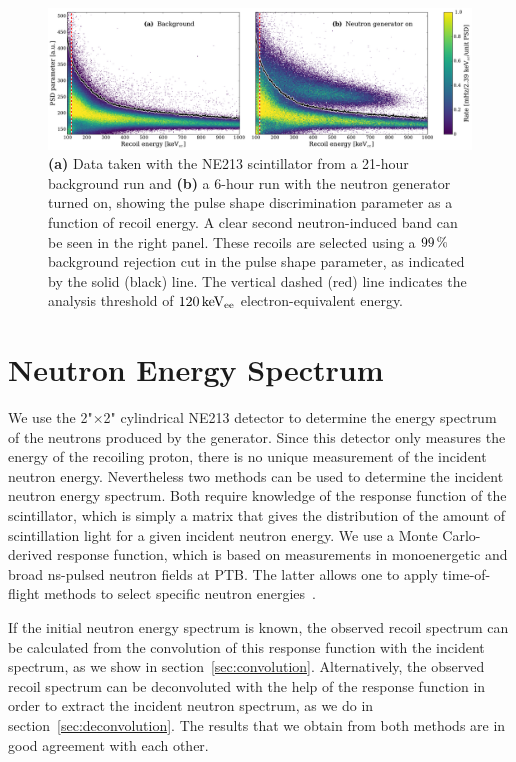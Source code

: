 \begin{figure}[!htbp]
\centering
    \includegraphics[width=1.0\textwidth]{figures/ng/hist2d_bg_and_fg}
    \caption{{\bf (a)} Data taken with the NE213 scintillator from a 21-hour background run and {\bf (b)} a 6-hour run with the neutron generator turned on, showing the pulse shape discrimination parameter as a function of recoil energy. A clear second neutron-induced band can be seen in the right panel. These recoils are selected using a $99\,\mathrm{\%}$ background rejection cut in the pulse shape parameter, as indicated by the solid (black) line. The vertical dashed (red) line indicates the analysis threshold of $120\,\mathrm{keV_{ee}}$ electron-equivalent energy.}\label{fig:hist2d}
\end{figure}

\section{Neutron Energy Spectrum}\label{sec:en_spectrum}

We use the 2"$\times$2" cylindrical NE213 detector to determine the energy spectrum of the neutrons produced by the generator. Since this detector only measures the energy of the recoiling proton, there is no unique measurement of the incident neutron energy. Nevertheless two methods can be used to determine the incident neutron energy spectrum. Both require knowledge of the response function of the scintillator, which is simply a matrix that gives the distribution of the amount of scintillation light for a given incident neutron energy. We use a Monte Carlo-derived response function, which is based on measurements in monoenergetic and broad ns-pulsed neutron fields at PTB. The latter allows one to apply time-of-flight methods to select specific neutron energies~\cite{Dietze:1982,Klein:2002,Zimbal:2006}.

If the initial neutron energy spectrum is known, the observed recoil spectrum can  be calculated from the convolution of this response function with the incident spectrum, as we show in section~\ref{sec:convolution}. Alternatively, the observed recoil spectrum can be deconvoluted with the help of the response function in order to extract the incident neutron spectrum, as we do in section~\ref{sec:deconvolution}. The results that we obtain from both methods are in good agreement with each other.

